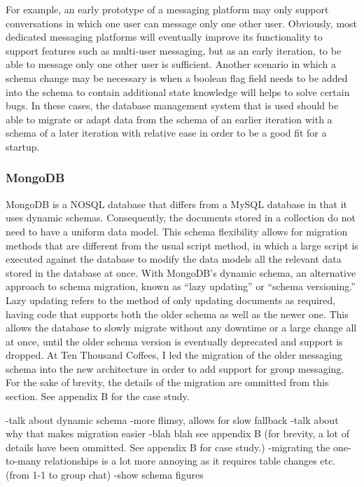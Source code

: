 \documentclass[12pt]{article}
\begin{document}
For example, an early prototype of a messaging platform may only support conversations in which one user can message only one other user. Obviously, most dedicated messaging platforms will eventually improve its functionality to support features such as multi-user messaging, but as an early iteration, to be able to message only one other user is sufficient. Another scenario in which a schema change may be necessary is when a boolean flag field needs to be added into the schema to contain additional state knowledge will helps to solve certain bugs. In these cases, the database management system that is used should be able to migrate or adapt data from the schema of an earlier iteration with a schema of a later iteration with relative ease in order to be a good fit for a startup.

\subsubsection{MongoDB}
MongoDB is a NOSQL database that differs from a MySQL database in that it uses dynamic schemas. Consequently, the documents stored in a collection do not need to have a uniform data model. This schema flexibility allows for migration methods that are different from the usual script method, in which a large script is executed against the database to modify the data models all the relevant data stored in the database at once. With MongoDB's dynamic schema, an alternative approach to schema migration, known as ``lazy updating'' or ``schema versioning.'' Lazy updating refers to the method of only updating documents as required, having code that supports both the older schema as well as the newer one. This allows the database to slowly migrate without any downtime or a large change all at once, until the older schema version is eventually deprecated and support is dropped. At Ten Thousand Coffees, I led the migration of the older messaging schema into the new architecture in order to add support for group messaging. For the sake of brevity, the details of the migration are ommitted from this section. See appendix B for the case study.

-talk about dynamic schema
-more flimsy, allows for slow fallback
-talk about why that makes migration easier
-blah blah see appendix B (for brevity, a lot of details have been ommitted. See appendix B for case study.) -migrating the one-to-many relationships is a lot more annoying as it requires table changes etc. (from 1-1 to group chat)
-show schema figures
\end{document}
